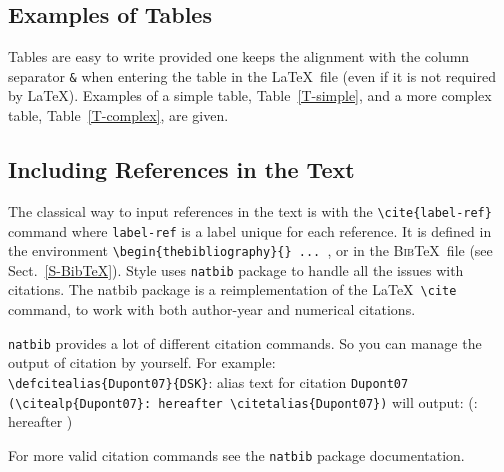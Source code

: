 \documentclass[namedreferences,hyperref,optionalrh]{spr-sola}
\newcommand{\BibTeX}{\textsc{Bib}\TeX}
\newcommand{\etal}{et al.}
\begin{document}
\subsection{Examples of Tables} %
\label{S-tables}
   Tables are easy to write provided one keeps the alignment 
with the column separator \texttt{\&} when entering the table 
in the \LaTeX\ file 
(even if it is not required by \LaTeX). Examples of a simple table,
Table~\ref{T-simple}, and a more complex table, Table~\ref{T-complex},
are given.

\subsection{Including References in the Text} %
\label{S-references}
The classical way to input references in the text is with the 
\verb+\cite{label-ref}+ command where \verb+label-ref+ is a label
unique for each reference.  It is defined in the environment
\verb+\begin{thebibliography}{} ... +, or in the \BibTeX\ file
(see Sect.~\ref{S-BibTeX}). 
Style uses \texttt{natbib} package to handle all the issues with citations.
The natbib package is a reimplementation of the \LaTeX\ \verb+\cite+ command, 
to work with both author-year and numerical citations.

\texttt{natbib} provides a lot of different citation commands. So you can manage the output of citation by yourself.
For example:\\
\verb+\defcitealias{Dupont07}{DSK}+: alias text for citation \texttt{Dupont07}\\
\verb+(\citealp{Dupont07}: hereafter \citetalias{Dupont07})+ will output:\linebreak 
                                  (\citealp{Dupont07}: hereafter )

For more valid citation commands see the \texttt{natbib} package documentation.

                                  
\end{document}
